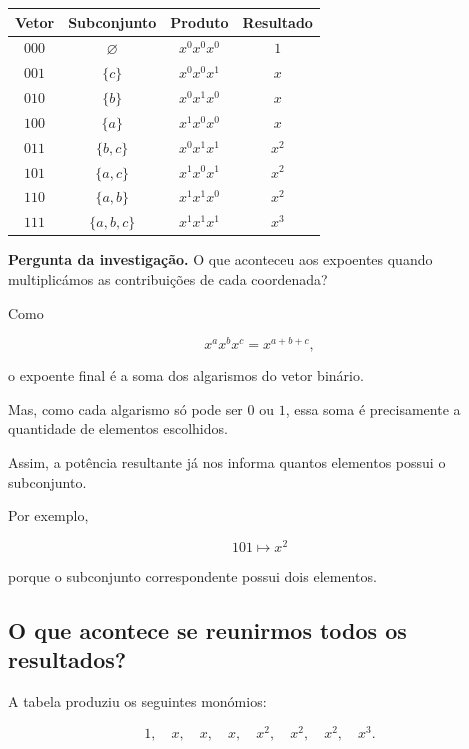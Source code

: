 \documentclass[11pt,a4paper,oneside]{book}
\newcommand{\Pergunta}[1]{\begin{perguntabox}\textbf{Pergunta da investigação.} #1\end{perguntabox}}
\renewcommand\arraystretch{1.18}
\begin{document}
\begin{center}
\renewcommand{\arraystretch}{1.5}
\begin{tabular}{c|c|c|c}
\hline
\textbf{Vetor} &
\textbf{Subconjunto} &
\textbf{Produto} &
\textbf{Resultado}\\
\hline
$000$ & $\varnothing$
& $x^0x^0x^0$ & $1$\\

$001$ & $\{c\}$
& $x^0x^0x^1$ & $x$\\

$010$ & $\{b\}$
& $x^0x^1x^0$ & $x$\\

$100$ & $\{a\}$
& $x^1x^0x^0$ & $x$\\

$011$ & $\{b,c\}$
& $x^0x^1x^1$ & $x^2$\\

$101$ & $\{a,c\}$
& $x^1x^0x^1$ & $x^2$\\

$110$ & $\{a,b\}$
& $x^1x^1x^0$ & $x^2$\\

$111$ & $\{a,b,c\}$
& $x^1x^1x^1$ & $x^3$\\
\hline
\end{tabular}
\end{center}

\Pergunta{O que aconteceu aos expoentes quando
multiplicámos as contribuições de cada coordenada?}

Como

\[
x^a x^b x^c=x^{a+b+c},
\]

o expoente final é a soma dos algarismos
do vetor binário.

Mas, como cada algarismo só pode ser $0$ ou $1$,
essa soma é precisamente a quantidade de
elementos escolhidos.

Assim, a potência resultante já nos informa
quantos elementos possui o subconjunto.

Por exemplo,

\[
101\longmapsto x^2
\]

porque o subconjunto correspondente possui
dois elementos.

\subsection*{O que acontece se reunirmos todos os resultados?}

A tabela produziu os seguintes monómios:

\[
1,\quad x,\quad x,\quad x,\quad
x^2,\quad x^2,\quad x^2,\quad x^3.
\]
\end{document}
